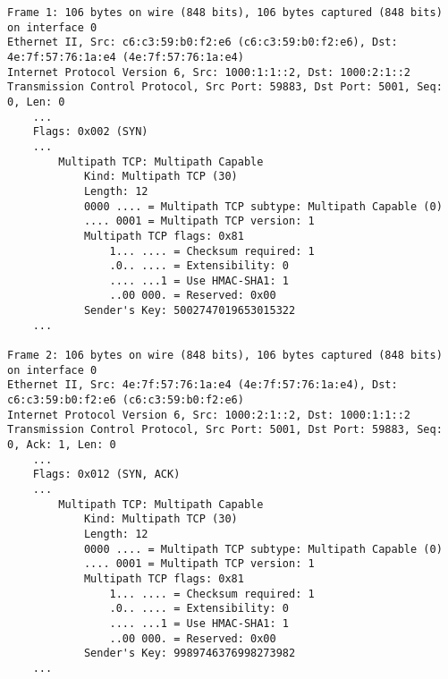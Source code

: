 \begingroup
    \fontsize{8pt}{9pt}\selectfont
	\begin{verbatim}
Frame 1: 106 bytes on wire (848 bits), 106 bytes captured (848 bits) on interface 0
Ethernet II, Src: c6:c3:59:b0:f2:e6 (c6:c3:59:b0:f2:e6), Dst: 4e:7f:57:76:1a:e4 (4e:7f:57:76:1a:e4)
Internet Protocol Version 6, Src: 1000:1:1::2, Dst: 1000:2:1::2
Transmission Control Protocol, Src Port: 59883, Dst Port: 5001, Seq: 0, Len: 0
    ...
    Flags: 0x002 (SYN)
    ...
        Multipath TCP: Multipath Capable
            Kind: Multipath TCP (30)
            Length: 12
            0000 .... = Multipath TCP subtype: Multipath Capable (0)
            .... 0001 = Multipath TCP version: 1
            Multipath TCP flags: 0x81
                1... .... = Checksum required: 1
                .0.. .... = Extensibility: 0
                .... ...1 = Use HMAC-SHA1: 1
                ..00 000. = Reserved: 0x00
            Sender's Key: 5002747019653015322
    ...

Frame 2: 106 bytes on wire (848 bits), 106 bytes captured (848 bits) on interface 0
Ethernet II, Src: 4e:7f:57:76:1a:e4 (4e:7f:57:76:1a:e4), Dst: c6:c3:59:b0:f2:e6 (c6:c3:59:b0:f2:e6)
Internet Protocol Version 6, Src: 1000:2:1::2, Dst: 1000:1:1::2
Transmission Control Protocol, Src Port: 5001, Dst Port: 59883, Seq: 0, Ack: 1, Len: 0
    ...
    Flags: 0x012 (SYN, ACK)
    ...
        Multipath TCP: Multipath Capable
            Kind: Multipath TCP (30)
            Length: 12
            0000 .... = Multipath TCP subtype: Multipath Capable (0)
            .... 0001 = Multipath TCP version: 1
            Multipath TCP flags: 0x81
                1... .... = Checksum required: 1
                .0.. .... = Extensibility: 0
                .... ...1 = Use HMAC-SHA1: 1
                ..00 000. = Reserved: 0x00
            Sender's Key: 9989746376998273982
    ...


\end{verbatim}
